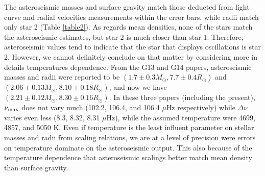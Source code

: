 

The asteroseismic masses and surface gravity match those deducted from light curve and radial velocities measurements within the error bars, while radii match only star 2 (Table \ref{table2}). As regards mean densities, none of the stars match the asteroseismic estimates, but star 2 is much closer than star 1. Therefore, asteroseismic values tend to indicate that the star that displays oscillations is star 2. However, we cannot definitely conclude on that matter by considering more in details temperatures dependence. From the G13 and G14 papers, asteroseismic masses and radii were reported to be $(1.7\pm0.3 M_\odot, 7.7\pm0.4 R_\odot)$ and $(2.06\pm0.13 M_\odot, 8.10\pm0.18 R_\odot)$, and now we have $(2.21\pm0.12 M_\odot, 8.30\pm0.16 R_\odot)$. In these three papers (including the present), $\nu_{\rm{max}}$ does not vary much (102.2, 106.4, and 106.4 $\mu$Hz respectively) while $\Delta\nu$ varies even less (8.3, 8.32, 8.31 $\mu$Hz), while the assumed temperature were 4699, 4857, and 5050 K. Even if temperature is the least influent parameter on stellar masses and radii from scaling relations, we are at a level of precision were errors on temperature dominate on the asteroseismic output. This also because of the temperature dependence that asteroseismic scalings better match mean density than surface gravity.




  
  
  
  
  
  
  
  
  
  
  
  
  
  
  
  
  
  
  
  
  
  
  
  
  
  
  
  
  
  
  
  
  
  
  
  